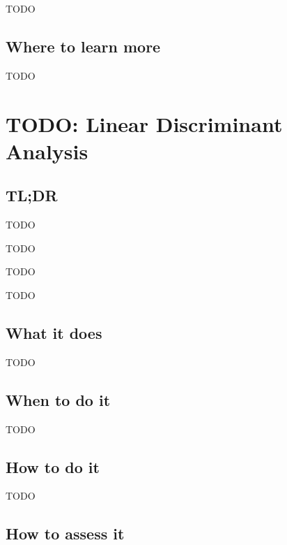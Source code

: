 \documentclass[
]{book}
\providecommand{\tightlist}{%
  \setlength{\itemsep}{0pt}\setlength{\parskip}{0pt}}
\begin{document}
TODO

\hypertarget{where-to-learn-more-3}{%
\section{Where to learn more}\label{where-to-learn-more-3}}

TODO

\hypertarget{linear-discriminant-analysis}{%
\chapter{TODO: Linear Discriminant Analysis}\label{linear-discriminant-analysis}}

\hypertarget{tldr-4}{%
\section{TL;DR}\label{tldr-4}}

\begin{description}
\tightlist
\item[What it does]
TODO
\item[When to do it]
TODO
\item[How to do it]
TODO
\item[How to assess it]
TODO
\end{description}

\hypertarget{what-it-does-4}{%
\section{What it does}\label{what-it-does-4}}

TODO

\hypertarget{when-to-do-it-4}{%
\section{When to do it}\label{when-to-do-it-4}}

TODO

\hypertarget{how-to-do-it-4}{%
\section{How to do it}\label{how-to-do-it-4}}

TODO

\hypertarget{how-to-assess-it-4}{%
\section{How to assess it}\label{how-to-assess-it-4}}
\end{document}
